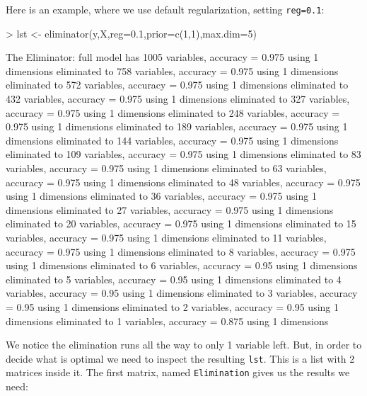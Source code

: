 \documentclass[a4paper]{article}
\begin{document}
Here is an example, where we use default regularization, setting \texttt{reg=0.1}:
\begin{Schunk}
\begin{Sinput}
> lst <- eliminator(y,X,reg=0.1,prior=c(1,1),max.dim=5)
\end{Sinput}
\begin{Soutput}
The Eliminator:
   full model has 1005 variables, accuracy = 0.975 using 1 dimensions
   eliminated to 758 variables, accuracy = 0.975 using 1 dimensions
   eliminated to 572 variables, accuracy = 0.975 using 1 dimensions
   eliminated to 432 variables, accuracy = 0.975 using 1 dimensions
   eliminated to 327 variables, accuracy = 0.975 using 1 dimensions
   eliminated to 248 variables, accuracy = 0.975 using 1 dimensions
   eliminated to 189 variables, accuracy = 0.975 using 1 dimensions
   eliminated to 144 variables, accuracy = 0.975 using 1 dimensions
   eliminated to 109 variables, accuracy = 0.975 using 1 dimensions
   eliminated to 83 variables, accuracy = 0.975 using 1 dimensions
   eliminated to 63 variables, accuracy = 0.975 using 1 dimensions
   eliminated to 48 variables, accuracy = 0.975 using 1 dimensions
   eliminated to 36 variables, accuracy = 0.975 using 1 dimensions
   eliminated to 27 variables, accuracy = 0.975 using 1 dimensions
   eliminated to 20 variables, accuracy = 0.975 using 1 dimensions
   eliminated to 15 variables, accuracy = 0.975 using 1 dimensions
   eliminated to 11 variables, accuracy = 0.975 using 1 dimensions
   eliminated to 8 variables, accuracy = 0.975 using 1 dimensions
   eliminated to 6 variables, accuracy = 0.95 using 1 dimensions
   eliminated to 5 variables, accuracy = 0.95 using 1 dimensions
   eliminated to 4 variables, accuracy = 0.95 using 1 dimensions
   eliminated to 3 variables, accuracy = 0.95 using 1 dimensions
   eliminated to 2 variables, accuracy = 0.95 using 1 dimensions
   eliminated to 1 variables, accuracy = 0.875 using 1 dimensions
\end{Soutput}
\end{Schunk}
We notice the elimination runs all the way to only 1 variable left. But, in order to decide what is optimal we need to inspect the resulting \texttt{lst}. This is a list with 2 matrices inside it. The first matrix, named \texttt{Elimination} gives us the results we need:
\end{document}
